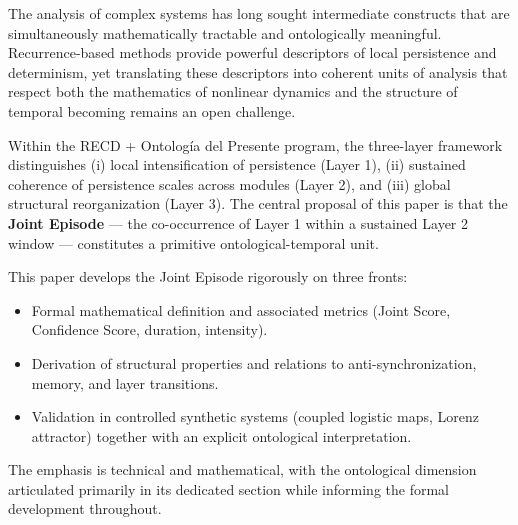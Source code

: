 The analysis of complex systems has long sought intermediate constructs that are simultaneously mathematically tractable and ontologically meaningful. Recurrence-based methods provide powerful descriptors of local persistence and determinism, yet translating these descriptors into coherent units of analysis that respect both the mathematics of nonlinear dynamics and the structure of temporal becoming remains an open challenge.

Within the RECD + Ontología del Presente program, the three-layer framework distinguishes (i) local intensification of persistence (Layer 1), (ii) sustained coherence of persistence scales across modules (Layer 2), and (iii) global structural reorganization (Layer 3). The central proposal of this paper is that the \textbf{Joint Episode} — the co-occurrence of Layer 1 within a sustained Layer 2 window — constitutes a primitive ontological-temporal unit.

This paper develops the Joint Episode rigorously on three fronts:
\begin{itemize}
    \item Formal mathematical definition and associated metrics (Joint Score, Confidence Score, duration, intensity).
    \item Derivation of structural properties and relations to anti-synchronization, memory, and layer transitions.
    \item Validation in controlled synthetic systems (coupled logistic maps, Lorenz attractor) together with an explicit ontological interpretation.
\end{itemize}

The emphasis is technical and mathematical, with the ontological dimension articulated primarily in its dedicated section while informing the formal development throughout.
